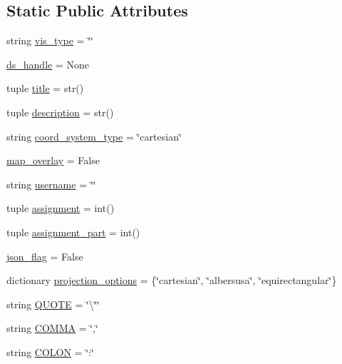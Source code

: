 \subsection*{Static Public Attributes}
\begin{DoxyCompactItemize}
\item 
string \hyperlink{class_bridges_1_1bridges_1_1_bridges_aec289f4a18867c2fef080a4faa092e8e}{vis\+\_\+type} = \char`\"{}\char`\"{}
\item 
\hyperlink{class_bridges_1_1bridges_1_1_bridges_abfb616560e034d466cd624132d3a96a3}{ds\+\_\+handle} = None
\item 
tuple \hyperlink{class_bridges_1_1bridges_1_1_bridges_adfe0d9b713e54711c8a682054ba763c3}{title} = str()
\item 
tuple \hyperlink{class_bridges_1_1bridges_1_1_bridges_abbc20a6c63c12ce54ef567380139d2c4}{description} = str()
\item 
string \hyperlink{class_bridges_1_1bridges_1_1_bridges_a82068879504b788bb70470fd04bc3c55}{coord\+\_\+system\+\_\+type} = \char`\"{}cartesian\char`\"{}
\item 
\hyperlink{class_bridges_1_1bridges_1_1_bridges_a925840aac84da0d17db238e5628d5f1a}{map\+\_\+overlay} = False
\item 
string \hyperlink{class_bridges_1_1bridges_1_1_bridges_a09593511340ae03bed2abbf9dd12f48f}{username} = \char`\"{}\char`\"{}
\item 
tuple \hyperlink{class_bridges_1_1bridges_1_1_bridges_a2532355e121918d9c30c4fb19161e92e}{assignment} = int()
\item 
tuple \hyperlink{class_bridges_1_1bridges_1_1_bridges_a16beecb895f3b4814ac213e81394a155}{assignment\+\_\+part} = int()
\item 
\hyperlink{class_bridges_1_1bridges_1_1_bridges_a93088231d5f240848046e8065330aa4f}{json\+\_\+flag} = False
\item 
dictionary \hyperlink{class_bridges_1_1bridges_1_1_bridges_a0e1ec4382d41e2f268dbf37ac583c803}{projection\+\_\+options} = \{\char`\"{}cartesian\char`\"{}, \char`\"{}albersusa\char`\"{}, \char`\"{}equirectangular\char`\"{}\}
\item 
string \hyperlink{class_bridges_1_1bridges_1_1_bridges_afb82742483cfcad189739b6f772b8a12}{Q\+U\+O\+T\+E} = \char`\"{}\textbackslash{}\char`\"{}\char`\"{}
\item 
string \hyperlink{class_bridges_1_1bridges_1_1_bridges_a009b6e8d4a7c23a014ed8e5089eb7357}{C\+O\+M\+M\+A} = \char`\"{},\char`\"{}
\item 
string \hyperlink{class_bridges_1_1bridges_1_1_bridges_abfa62a66fca4dae2fe727a590a284f6b}{C\+O\+L\+O\+N} = \char`\"{}\+:\char`\"{}

\end{DoxyCompactItemize}
